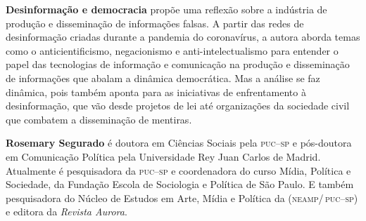\textbf{Desinformação e democracia} propõe uma reflexão sobre a indústria de produção e disseminação de informações falsas. A partir das redes de desinformação criadas durante a pandemia do coronavírus, a autora aborda temas como o anticientificismo, negacionismo e anti-intelectualismo para entender o papel das tecnologias de informação e comunicação na produção e disseminação de informações que abalam a dinâmica democrática. Mas a análise se faz dinâmica, pois também aponta para as iniciativas de enfrentamento à desinformação, que vão desde projetos de lei até organizações da sociedade civil que combatem a disseminação de mentiras. 

\textbf{Rosemary Segurado} é doutora em Ciências Sociais pela \textsc{puc--sp} e pós-doutora em Comunicação Política pela Universidade Rey Juan Carlos de Madrid. Atualmente é pesquisadora da \textsc{puc--sp} e coordenadora do curso Mídia, Política e Sociedade, da Fundação Escola de Sociologia e Política de São Paulo. 
E também pesquisadora do Núcleo de Estudos em Arte, Mídia e Política da (\textsc{neamp/\,puc--sp}) e editora da \textit{Revista Aurora}.


